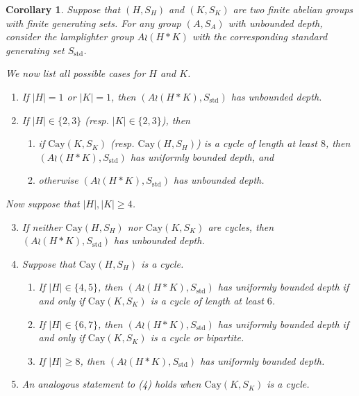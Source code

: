 \documentclass[reqno,oneside]{amsart}
\newcommand{\cay}[2]{\mathrm{Cay}(#1,#2)}
\newcommand{\std}{S_{\mathrm{std}}}
\theoremstyle{plain}
\newtheorem{cor}[thm]{Corollary}
\theoremstyle{definition}
\begin{document}
\begin{cor}\label{cor: free products of finite abelian groups characterization of lamplighter depth} Suppose that $(H,S_H)$ and $(K,S_K)$ are two finite abelian groups with finite generating sets. For any group $(A,S_A)$ with unbounded depth, consider the lamplighter group $A\wr(H*K)$ with the corresponding standard generating set $\std$. 
	
	We now list all possible cases for $H$ and $K$.
	\begin{enumerate}
		\item If $|H|=1$ or $|K|=1$, then $(A\wr(H*K),\std)$ has unbounded depth.
		
		\item If $|H|\in \{2,3\}$ (resp. $|K|\in \{2,3\}$), then
		\begin{enumerate}
			\item if $\cay{K}{S_K}$ (resp. $\cay{H}{S_H}$) is a cycle of length at least $8$, then $(A\wr(H*K),\std)$ has uniformly bounded depth, and
			
			\item otherwise $(A\wr(H*K),\std)$ has unbounded depth.
		\end{enumerate}
	\end{enumerate}
	Now suppose that $|H|,|K|\ge 4$.
	\begin{enumerate}\setcounter{enumi}{2}
		\item If neither $\cay{H}{S_H}$ nor $\cay{K}{S_K}$ are cycles, then $(A\wr(H*K),\std)$ has unbounded depth.
		\item Suppose that $\cay{H}{S_H}$ is a cycle.
		\begin{enumerate}
			\item If $|H|\in \{4,5\}$, then $(A\wr(H*K),\std)$ has uniformly bounded depth if and only if $\cay{K}{S_K}$ is a cycle of length at least $6$.
			
			\item If $|H|\in \{6,7\}$, then $(A\wr(H*K),\std)$ has uniformly bounded depth if and only if $\cay{K}{S_K}$ is a cycle or bipartite.
			
			\item If $|H|\ge 8$, then $(A\wr(H*K),\std)$ has uniformly bounded depth.
		\end{enumerate}
		\item An analogous statement to (4) holds when $\cay{K}{S_K}$ is a cycle.
	\end{enumerate}
\end{cor}
\end{document}
